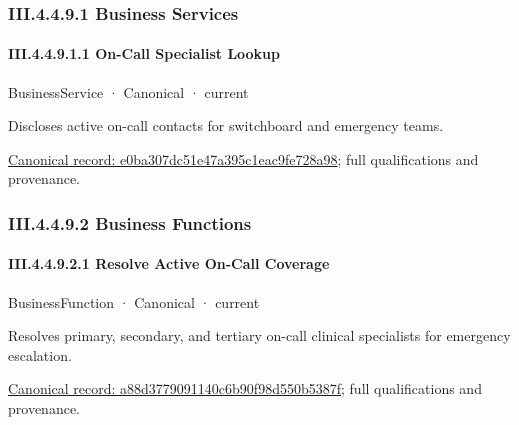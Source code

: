 \subsubsection*{III.4.4.9.1 Business Services}
\label{navigation:III.4.4.9.1}

\paragraph*{III.4.4.9.1.1 On-Call Specialist Lookup}
\label{navigation:III.4.4.9.1.1}

\label{element:e0ba307dc51e47a395c1eac9fe728a98}
{\small BusinessService · Canonical · current}\par

Discloses active on-call contacts for switchboard and emergency teams.


{\footnotesize \href{../../../../../../../continuum/business/business-service/e0ba307dc51e47a395c1eac9fe728a98.md}{Canonical record: e0ba307dc51e47a395c1eac9fe728a98}; full qualifications and provenance.}\par
\subsubsection*{III.4.4.9.2 Business Functions}
\label{navigation:III.4.4.9.2}

\paragraph*{III.4.4.9.2.1 Resolve Active On-Call Coverage}
\label{navigation:III.4.4.9.2.1}

\label{element:a88d3779091140c6b90f98d550b5387f}
{\small BusinessFunction · Canonical · current}\par

Resolves primary, secondary, and tertiary on-call clinical specialists for emergency escalation.


{\footnotesize \href{../../../../../../../continuum/business/business-function/a88d3779091140c6b90f98d550b5387f.md}{Canonical record: a88d3779091140c6b90f98d550b5387f}; full qualifications and provenance.}\par
